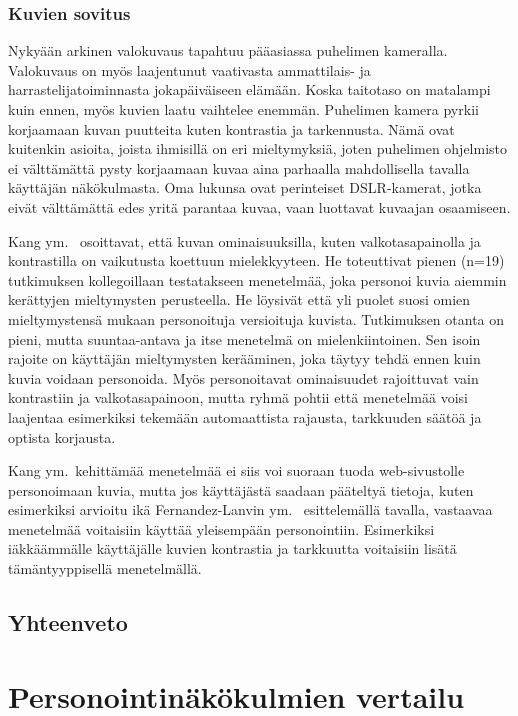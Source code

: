 \documentclass[finnish, 12pt, a4paper, elec, utf8, a-1b, online]{aaltothesis}
\begin{document}
\subsubsection{Kuvien sovitus}

Nykyään arkinen valokuvaus tapahtuu pääasiassa puhelimen kameralla. Valokuvaus
on myös laajentunut vaativasta ammattilais- ja harrastelijatoiminnasta
jokapäiväiseen elämään. Koska taitotaso on matalampi kuin ennen, myös kuvien
laatu vaihtelee enemmän. Puhelimen kamera pyrkii korjaamaan kuvan puutteita
kuten kontrastia ja tarkennusta. Nämä ovat kuitenkin asioita, joista ihmisillä
on eri mieltymyksiä, joten puhelimen ohjelmisto ei välttämättä pysty korjaamaan
kuvaa aina parhaalla mahdollisella tavalla käyttäjän näkökulmasta. Oma lukunsa
ovat perinteiset DSLR-kamerat, jotka eivät välttämättä edes yritä parantaa
kuvaa, vaan luottavat kuvaajan osaamiseen.

Kang ym.~\cite{5539850} osoittavat, että kuvan ominaisuuksilla, kuten
valkotasapainolla ja kontrastilla on vaikutusta koettuun mielekkyyteen. He
toteuttivat pienen (n=19) tutkimuksen kollegoillaan testatakseen menetelmää,
joka personoi kuvia aiemmin kerättyjen mieltymysten perusteella. He löysivät
että yli puolet suosi omien mieltymystensä mukaan personoituja versioituja
kuvista. Tutkimuksen otanta on pieni, mutta suuntaa-antava ja itse menetelmä on
mielenkiintoinen. Sen isoin rajoite on käyttäjän mieltymysten kerääminen, joka
täytyy tehdä ennen kuin kuvia voidaan personoida. Myös personoitavat
ominaisuudet rajoittuvat vain kontrastiin ja valkotasapainoon, mutta ryhmä
pohtii että menetelmää voisi laajentaa esimerkiksi tekemään automaattista
rajausta, tarkkuuden säätöä ja optista korjausta.

Kang ym.~kehittämää menetelmää ei siis voi suoraan tuoda web-sivustolle
personoimaan kuvia, mutta jos käyttäjästä saadaan pääteltyä tietoja, kuten
esimerkiksi arvioitu ikä Fernandez-Lanvin ym.~\cite{fernandez2018dimension}
esittelemällä tavalla, vastaavaa menetelmää voitaisiin käyttää yleisempään
personointiin. Esimerkiksi iäkkäämmälle käyttäjälle kuvien kontrastia ja
tarkkuutta voitaisiin lisätä tämäntyyppisellä menetelmällä.

\subsection{Yhteenveto}

\clearpage

\section{Personointinäkökulmien vertailu}
\end{document}
